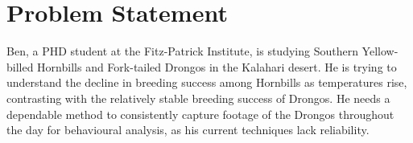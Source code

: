 \documentclass[class=report,11pt,crop=false]{standalone}
\begin{document}



\chapter{Problem Statement}
Ben, a PHD student at the Fitz-Patrick Institute, is studying Southern Yellow-billed Hornbills and Fork-tailed Drongos in the Kalahari desert. He is trying to understand the decline in breeding success among Hornbills as temperatures rise, contrasting with the relatively stable breeding success of Drongos. He needs a dependable method to consistently capture footage of the Drongos throughout the day for behavioural analysis, as his current techniques lack reliability.





\ifstandalone

\printnoidxglossary[type=\acronymtype,nonumberlist]
\fi
\end{document}
